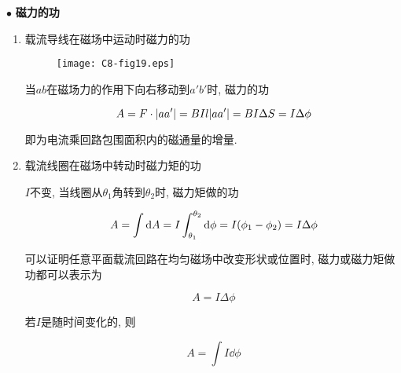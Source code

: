 $\bullet$ \textbf{磁力的功}

\begin{enumerate}[itemindent=1em]
	
	\item 载流导线在磁场中运动时磁力的功
	
	\begin{figure}[H]
		\centering
		\texttt{[image: C8-fig19.eps]}
	\end{figure}
	
	当$ab$在磁场力的作用下向右移动到$a'b'$时, 磁力的功
	
	\begin{equation}
		A = F \cdot \abs{aa'} = BIl \abs{aa'} = BI\Delta S = I\Delta \phi \label{C8-eq19}
	\end{equation}
	
	即为电流乘回路包围面积内的磁通量的增量. 
	
	\item 载流线圈在磁场中转动时磁力矩的功
	
	$I$不变, 当线圈从$\theta_1$角转到$\theta_2$时, 磁力矩做的功
	
	\begin{equation}
		A = \int \dd{A} = I \int_{\theta_1}^{\theta_2} \dd{\phi} = I\qty(\phi_1 - \phi_2) = I \Delta \phi \label{C8-eq20}
	\end{equation}
	
	可以证明任意平面载流回路在均匀磁场中改变形状或位置时, 磁力或磁力矩做功都可以表示为
	
	\begin{equation}
		A = I \Delta \phi \label{C8-eq21}
	\end{equation}
	
	若$I$是随时间变化的, 则
	
	\begin{equation}
		A = \int I \dd{\phi} \label{C8-eq22}
	\end{equation}

\end{enumerate}

